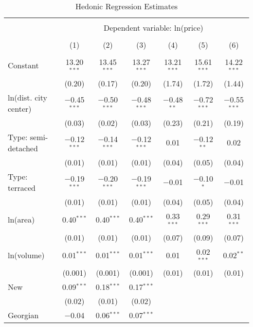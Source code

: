 
\begin{table}[!htbp] \centering 
  \caption{Hedonic Regression Estimates} 
  \label{tab:hedreg} 
\footnotesize 
\begin{tabular}{@{\extracolsep{5pt}}lcccccc} 
\\[-1.8ex]\hline 
\hline \\[-1.8ex] 
 & \multicolumn{6}{c}{Dependent variable: ln(price)} \\ 
\cline{2-7} 
\\[-1.8ex] & (1) & (2) & (3) & (4) & (5) & (6)\\ 
\hline \\[-1.8ex] 
 Constant & 13.20$^{***}$ & 13.45$^{***}$ & 13.27$^{***}$ & 13.21$^{***}$ & 15.61$^{***}$ & 14.22$^{***}$ \\ 
  & (0.20) & (0.17) & (0.20) & (1.74) & (1.72) & (1.44) \\ 
  ln(dist. city center) & $-$0.45$^{***}$ & $-$0.50$^{***}$ & $-$0.48$^{***}$ & $-$0.48$^{**}$ & $-$0.72$^{***}$ & $-$0.55$^{***}$ \\ 
  & (0.03) & (0.02) & (0.03) & (0.23) & (0.21) & (0.19) \\ 
  Type: semi-detached & $-$0.12$^{***}$ & $-$0.14$^{***}$ & $-$0.12$^{***}$ & 0.01 & $-$0.12$^{**}$ & 0.02 \\ 
  & (0.01) & (0.01) & (0.01) & (0.04) & (0.05) & (0.04) \\ 
  Type: terraced & $-$0.19$^{***}$ & $-$0.20$^{***}$ & $-$0.19$^{***}$ & $-$0.01 & $-$0.10$^{*}$ & $-$0.01 \\ 
  & (0.01) & (0.01) & (0.01) & (0.04) & (0.05) & (0.04) \\ 
  ln(area) & 0.40$^{***}$ & 0.40$^{***}$ & 0.40$^{***}$ & 0.33$^{***}$ & 0.29$^{***}$ & 0.31$^{***}$ \\ 
  & (0.01) & (0.01) & (0.01) & (0.07) & (0.09) & (0.07) \\ 
  ln(volume) & 0.01$^{***}$ & 0.01$^{***}$ & 0.01$^{***}$ & 0.01 & 0.02$^{***}$ & 0.02$^{**}$ \\ 
  & (0.001) & (0.001) & (0.001) & (0.01) & (0.01) & (0.01) \\ 
  New & 0.09$^{***}$ & 0.18$^{***}$ & 0.17$^{***}$ &  &  &  \\ 
  & (0.02) & (0.01) & (0.02) &  &  &  \\ 
  Georgian & $-$0.04 & 0.06$^{***}$ & 0.07$^{***}$ &  &  &  \\ 

\end{tabular}
\end{table}
